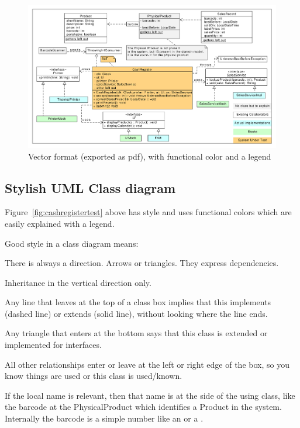 \begin{figure}[htbp]
  \includegraphics[width=\linewidth]{images/perishablesales.pdf}
  \caption{\label{fig:cashregistertest}Vector format (exported as pdf), with functional color and a legend}
\end{figure}


\subsection{Stylish UML Class diagram}
\label{sec:stylish}
Figure~\vref{fig:cashregistertest} above has style and uses functional colors which are easily explained with a legend.

Good style in a class diagram means:
\begin{Itemize}
\item There is always a direction. Arrows or triangles. They express dependencies.
\item Inheritance in the vertical direction only.
  \begin{Itemize}
    \item Any line that leaves at the top of a class box implies that this
      implements (dashed line) or extends (solid line), without looking where the line ends.
    \item Any triangle that enters at the bottom says that this class is extended or implemented for interfaces.
  \end{Itemize}
  \item All other relationships enter or leave at the left or right edge of the box, so you know things are used
  or this class is used/known.
  \begin{Itemize}
  \item If the local name is relevant, then that name is at the side of the using class, like the barcode at the PhysicalProduct which identifies a Product in the system. Internally the barcode is a simple number like an  or a .
  \end{Itemize}
\end{Itemize}

